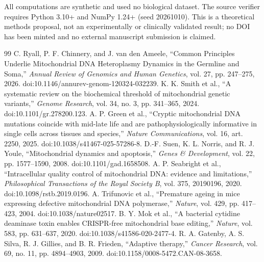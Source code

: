 \documentclass[11pt]{article}
\begin{document}
All computations are synthetic and used no biological dataset. The source verifier requires Python 3.10+ and NumPy 1.24+ (seed 20261010). This is a theoretical methods proposal, not an experimentally or clinically validated result; no DOI has been minted and no external manuscript submission is claimed.

\begin{thebibliography}{99}\small
\setlength{\itemsep}{0pt}
 C. Ryall, P. F. Chinnery, and J. van den Ameele, ``Common Principles Underlie Mitochondrial DNA Heteroplasmy Dynamics in the Germline and Soma,'' \emph{Annual Review of Genomics and Human Genetics}, vol. 27, pp. 247--275, 2026. doi:10.1146/annurev-genom-120324-032239.
 K. K. Smith et al., ``A systematic review on the biochemical threshold of mitochondrial genetic variants,'' \emph{Genome Research}, vol. 34, no. 3, pp. 341--365, 2024. doi:10.1101/gr.278200.123.
 A. P. Green et al., ``Cryptic mitochondrial DNA mutations coincide with mid-late life and are pathophysiologically informative in single cells across tissues and species,'' \emph{Nature Communications}, vol. 16, art. 2250, 2025. doi:10.1038/s41467-025-57286-8.
 D.-F. Suen, K. L. Norris, and R. J. Youle, ``Mitochondrial dynamics and apoptosis,'' \emph{Genes \& Development}, vol. 22, pp. 1577--1590, 2008. doi:10.1101/gad.1658508.
 A. P. Seabright et al., ``Intracellular quality control of mitochondrial DNA: evidence and limitations,'' \emph{Philosophical Transactions of the Royal Society B}, vol. 375, 20190196, 2020. doi:10.1098/rstb.2019.0196.
 A. Trifunovic et al., ``Premature ageing in mice expressing defective mitochondrial DNA polymerase,'' \emph{Nature}, vol. 429, pp. 417--423, 2004. doi:10.1038/nature02517.
 B. Y. Mok et al., ``A bacterial cytidine deaminase toxin enables CRISPR-free mitochondrial base editing,'' \emph{Nature}, vol. 583, pp. 631--637, 2020. doi:10.1038/s41586-020-2477-4.
 R. A. Gatenby, A. S. Silva, R. J. Gillies, and B. R. Frieden, ``Adaptive therapy,'' \emph{Cancer Research}, vol. 69, no. 11, pp. 4894--4903, 2009. doi:10.1158/0008-5472.CAN-08-3658.
\end{thebibliography}
\end{document}
